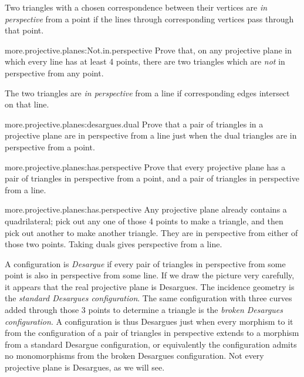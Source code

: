 Two triangles with a chosen correspondence between their vertices are \emph{in perspective} from a point if the lines through corresponding vertices pass through that point.
\begin{problem}{more.projective.planes:Not.in.perspective}
Prove that, on any projective plane in which every line has at least 4 points, there are two triangles which are \emph{not} in perspective from any point.
\end{problem}

The two triangles are \emph{in perspective} from a line if corresponding edges intersect on that line.
\begin{problem}{more.projective.planes:desargues.dual}
Prove that a pair of triangles in a projective plane are in perspective from a line just when the dual triangles are in perspective from a point.
\end{problem}
\begin{problem}{more.projective.planes:has.perspective}
Prove that every projective plane has a pair of triangles in perspective from a point, and a pair of triangles in perspective from a line.
\end{problem}
\begin{answer}{more.projective.planes:has.perspective}
Any projective plane already contains a quadrilateral; pick out any one of those 4 points to make a triangle, and then pick out another to make another triangle.
They are in perspective from either of those two points.
Taking duals gives perspective from a line.
\end{answer}
A configuration is \emph{Desargue} if every pair of triangles in perspective from some point is also in perspective from some line.
If we draw the picture very carefully, it appears that the real projective plane is Desargues.
The incidence geometry
is the \emph{standard Desargues configuration}.
The same configuration with three curves added through those 3 points to determine a triangle is the \emph{broken Desargues configuration}.
A configuration is thus Desargues just when every morphism to it from the configuration of a pair of triangles in perspective extends to a morphism from a standard Desargue configuration, or equivalently the configuration admits no monomorphisms from the broken Desargues configuration.
Not every projective plane is Desargues, as we will see.

